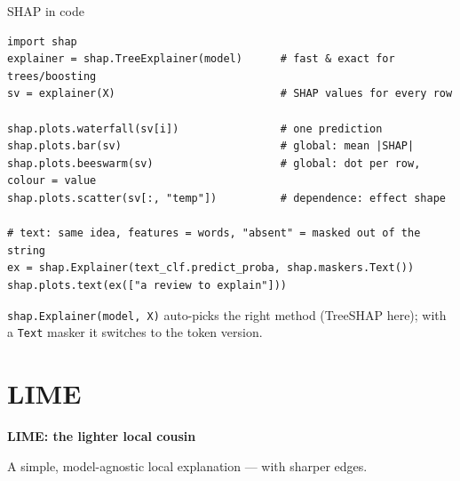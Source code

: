 \documentclass[aspectratio=169]{beamer}
\begin{document}
\begin{frame}[fragile]{SHAP in code}
\begin{lstlisting}
import shap
explainer = shap.TreeExplainer(model)      # fast & exact for trees/boosting
sv = explainer(X)                          # SHAP values for every row

shap.plots.waterfall(sv[i])                # one prediction
shap.plots.bar(sv)                         # global: mean |SHAP|
shap.plots.beeswarm(sv)                    # global: dot per row, colour = value
shap.plots.scatter(sv[:, "temp"])          # dependence: effect shape

# text: same idea, features = words, "absent" = masked out of the string
ex = shap.Explainer(text_clf.predict_proba, shap.maskers.Text())
shap.plots.text(ex(["a review to explain"]))
\end{lstlisting}
  \vskip 2pt
  \footnotesize \texttt{shap.Explainer(model, X)} auto-picks the right method (TreeSHAP here); with
  a \texttt{Text} masker it switches to the token version.
\end{frame}

\section{LIME}

\begin{frame}[plain]
  \vfill
  \begin{center}
    {\Large\color{popblue}\textbf{LIME: the lighter local cousin}}\\[0.9em]
    \begin{minipage}{0.82\textwidth}\centering\small
      A simple, model-agnostic local explanation --- with sharper edges.
    \end{minipage}
  \end{center}
  \vfill
\end{frame}
\end{document}
